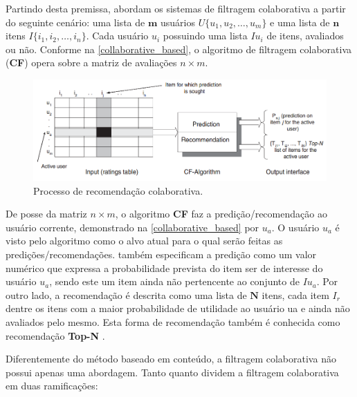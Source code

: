 Partindo desta premissa,  abordam os sistemas de filtragem colaborativa a partir do seguinte cenário: uma lista de $\textbf{m}$ usuários $U \lbrace u_{1}, u_{2}, …, u_{m} \rbrace$ e uma lista de $\textbf{n}$ itens $I \lbrace i_{1}, i_{2}, …, i_{n} \rbrace$. Cada usuário $u_{i}$ possuindo uma lista $Iu_{i}$ de itens, avaliados ou não. Conforme na \autoref{collaborative_based}, o algoritmo de filtragem colaborativa (\textbf{CF}) opera sobre a matriz de avaliações $n \times m$.

\begin{figure}[htb]
	\caption{\label{collaborative_based}Processo de recomendação colaborativa.}
	\begin{center}
		\includegraphics[scale=0.6]{images/collaborative_based.png}
	\end{center}
\end{figure}

De posse da matriz $n \times m$, o algoritmo \textbf{CF} faz a predição/recomendação ao usuário corrente, demonstrado na \autoref{collaborative_based} por $u_{a}$. O usuário $u_{a}$ é visto pelo algoritmo como o alvo atual para o qual serão feitas as predições/recomendações.  também especificam a predição como um valor numérico que expressa a probabilidade prevista do item ser de interesse do usuário $u_{a}$, sendo este um item ainda não pertencente ao conjunto de $Iu_{a}$. Por outro lado, a recomendação é descrita como uma lista de $\textbf{N}$ itens, cada item $I_{r}$ dentre os itens com a maior probabilidade de utilidade ao usuário ua e ainda não avaliados pelo mesmo. Esta forma de recomendação também é conhecida como recomendação \textbf{Top-N} \cite{adomavicius2005toward}.

Diferentemente do método baseado em conteúdo, a filtragem colaborativa não possui apenas uma abordagem. Tanto  quanto  dividem a filtragem colaborativa em duas ramificações:

